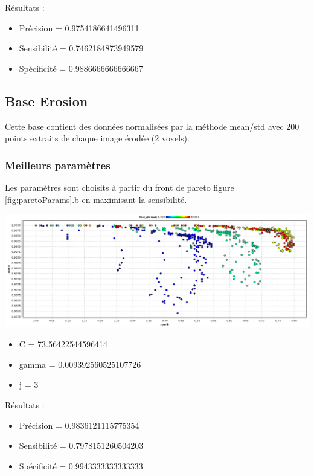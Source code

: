 Résultats :

\begin{itemize}
\item Précision = 0.9754186641496311	
\item Sensibilité = 0.7462184873949579
\item Spécificité = 0.9886666666666667
\end{itemize}


\subsection{Base Erosion}

Cette base contient des données normalisées par la méthode mean/std avec 200 points extraits de chaque image érodée (2 voxels).

\subsubsection{Meilleurs paramètres}

Les paramètres sont choisits à partir du front de pareto figure \ref{fig:paretoParams}.b en maximisant la sensibilité.

\includegraphics[width=14cm]{images/pareto_param_erosion.png}

\begin{itemize}
\item C = 73.56422544596414
\item gamma = 0.009392560525107726
\item j = 3
\end{itemize}

Résultats :

\begin{itemize}
\item Précision = 0.9836121115775354
\item Sensibilité = 0.7978151260504203
\item Spécificité = 0.9943333333333333
\end{itemize}

